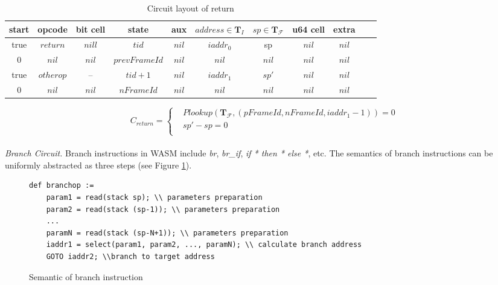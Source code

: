 \begin{table}[!h]
\begin{center}
\caption{Circuit layout of return}
\label{tbl:return-instruction}
\begin{tabular}{ | c | c | c | c | c | c | c | c | c | c | c | }
  \hline
  start & opcode & bit cell & state & aux & $address \in \mathbf{T}_{I}$ & $sp \in \mathbf{T}_\mathcal{F}$& u64 cell & extra \\ 
  \hline
   true & $return$ & $nill$ & $tid$ & $nil$ & $iaddr_0$ & sp & $nil$ & $nil$\\ 
 \hline
   0 & $nil$ & $nil$ & $prevFrameId$ & $nil$ & $nil$ & $nil$ & $nil$ & $nil$\\ 
 \hline
   true & $otherop$ & -- & $tid + 1$ & $nil$ & $iaddr_1$ & $sp'$ & $nil$ & $nil$\\
 \hline
   0 & $nil$ & $nil$ & $nFrameId$ & $nil$ & $nil$ & $nil$ & $nil$ & $nil$\\ 
 \hline
\end{tabular}

\end{center}
\end{table}
\begin{equation}
    C_{return} =  \begin{cases}
        &Plookup(\mathbf{T}_\mathcal{F}, (pFrameId, nFrameId, iaddr_1 - 1)) = 0 \\
        &sp' - sp = 0 \\
    \end{cases}
\label{eq: cs-return}
\end{equation}
\\
\noindent\emph{Branch Circuit.}
Branch instructions in WASM include \emph{br}, \emph{br\_if}, \emph{if * then * else *}, etc. The semantics of branch instructions can be uniformly abstracted as three steps (see Figure \ref{fig:inst-branch}).
\begin{figure}[h!]
\small
\centering
\begin{verbatim}
def branchop :=
    param1 = read(stack sp); \\ parameters preparation
    param2 = read(stack (sp-1)); \\ parameters preparation
    ...
    paramN = read(stack (sp-N+1)); \\ parameters preparation
    iaddr1 = select(param1, param2, ..., paramN); \\ calculate branch address
    GOTO iaddr2; \\branch to target address
\end{verbatim}
\caption{Semantic of branch instruction}
\label{fig:inst-branch}
\end{figure}
